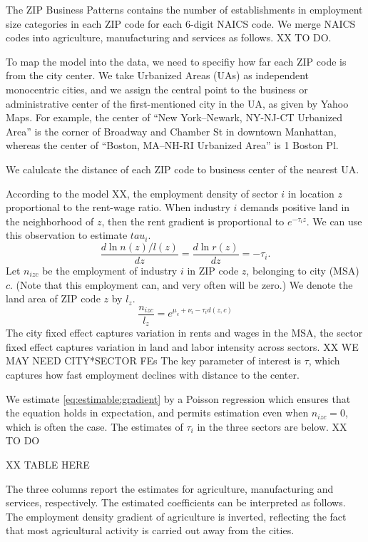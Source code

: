 \documentclass[12pt]{article}
\begin{document}
The ZIP Business Patterns contains the number of establishments in employment size categories in each ZIP code for each 6-digit NAICS code. We merge NAICS codes into agriculture, manufacturing and services as follows. XX TO DO.

To map the model into the data, we need to specifiy how far each ZIP code is from the city center. We take Urbanized Areas (UAs) as independent monocentric cities, and we assign the central point to the business or administrative center of the first-mentioned city in the UA, as given by Yahoo Maps. For example, the center of ``New York–Newark, NY-NJ-CT Urbanized Area'' is the corner of Broadway and Chamber St in downtown Manhattan, whereas the center of ``Boston, MA–NH-RI Urbanized Area'' is 1 Boston Pl.

We calulcate the distance of each ZIP code to business center of the nearest UA.

According to the model XX, the employment density of sector $i$ in location $z$ proportional to the rent-wage ratio. When industry $i$ demands positive land in the neighborhood of $z$, then the rent gradient is proportional to $e^{-\tau_iz}$. We can use this observation to estimate $tau_i$.
\[
\frac{d\ln n(z)/l(z)}{dz} =\frac{d\ln r(z)}{dz} = -\tau_i.
\]
Let $n_{izc}$ be the employment of industry $i$ in ZIP code $z$, belonging to city (MSA) $c$. (Note that this employment can, and very often will be zero.) We denote the land area of ZIP code $z$ by $l_z$.
\begin{equation}\label{eq:estimable:gradient}
\frac{n_{izc}}{l_z} = e^{\mu_c+\nu_i-\tau_i d(z,c)}
\end{equation}
The city fixed effect captures variation in rents and wages in the MSA, the sector fixed effect captures variation in land and labor intensity across sectors. XX WE MAY NEED CITY*SECTOR FEs The key parameter of interest is $\tau$, which captures how fast employment declines with distance to the center.

We estimate \eqref{eq:estimable:gradient} by a Poisson regression which ensures that the equation holds in expectation, and permits estimation even when $n_{izc}=0$, which is often the case. The estimates of $\tau_i$ in the three sectors are below. XX TO DO

XX TABLE HERE

The three columns report the estimates for agriculture, manufacturing and services, respectively. The estimated coefficients can be interpreted as follows. The employment density gradient of agriculture is inverted, reflecting the fact that most agricultural activity is carried out away from the cities.
\end{document}
